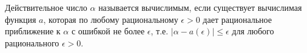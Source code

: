 Действительное число $\alpha$ называется вычислимым, если существует вычислимая функция $a$, которая по любому рациональному
$\epsilon > 0$ дает рациональное приближение к $\alpha$ с ошибкой не более $\epsilon$, т.е. $|\alpha - a(\epsilon)| \le
\epsilon$ для любого рационального $\epsilon > 0$. 